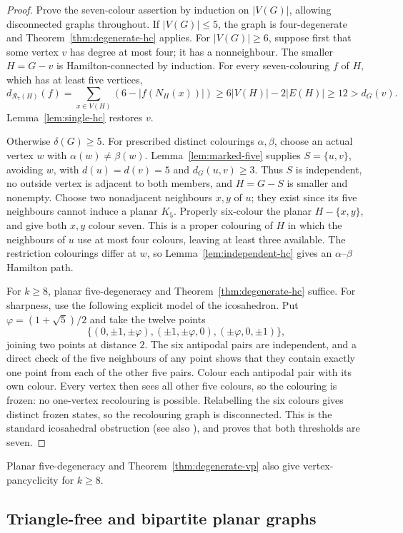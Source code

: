 \documentclass[11pt]{article}
\theoremstyle{remark}
\newcommand{\R}{\mathcal R}
\numberwithin{equation}{section}
\numberwithin{table}{section}
\begin{document}
\begin{proof}
Prove the seven-colour assertion by induction on $|V(G)|$, allowing
disconnected graphs throughout.  If $|V(G)|\le5$, the graph is
four-degenerate and Theorem~\ref{thm:degenerate-hc} applies.
For $|V(G)|\ge6$, suppose first that some vertex $v$ has degree at
most four; it has a nonneighbour.  The smaller $H=G-v$ is Hamilton-connected by induction.
For every seven-colouring $f$ of $H$, which has at least five vertices,
\[
 d_{\R_7(H)}(f)
 =\sum_{x\in V(H)}(6-|f(N_H(x))|)
 \ge6|V(H)|-2|E(H)|\ge12>d_G(v).
\]
Lemma~\ref{lem:single-hc} restores $v$.

Otherwise $\delta(G)\ge5$.  For prescribed distinct colourings
$\alpha,\beta$, choose an actual vertex $w$ with
$\alpha(w)\ne\beta(w)$.  Lemma~\ref{lem:marked-five} supplies
$S=\{u,v\}$, avoiding $w$, with $d(u)=d(v)=5$ and
$d_G(u,v)\ge3$.  Thus $S$ is independent, no outside vertex is
adjacent to both members, and $H=G-S$ is smaller and nonempty.
Choose two nonadjacent neighbours $x,y$ of $u$; they exist since its
five neighbours cannot induce a planar $K_5$.  Properly six-colour the
planar $H-\{x,y\}$, and give both $x,y$ colour seven.  This is a
proper colouring of $H$ in which the neighbours of $u$ use at most
four colours, leaving at least three available.  The restriction
colourings differ at $w$, so Lemma~\ref{lem:independent-hc} gives
an $\alpha$--$\beta$ Hamilton path.

For $k\ge8$, planar five-degeneracy and
Theorem~\ref{thm:degenerate-hc} suffice.  For sharpness, use the following
explicit model of the icosahedron.  Put $\varphi=(1+\sqrt5)/2$ and take the
twelve points
\[
 \{(0,\pm1,\pm\varphi),(\pm1,\pm\varphi,0),
          (\pm\varphi,0,\pm1)\},
\]
joining two points at distance $2$.  The six antipodal pairs are independent,
and a direct check of the five neighbours of any point shows that they contain
exactly one point from each of the other five pairs.  Colour each antipodal
pair with its own colour.  Every vertex then sees all other five colours, so
the colouring is frozen: no one-vertex recolouring is possible.  Relabelling
the six colours gives distinct frozen states, so the recolouring graph is
disconnected.  This is the standard icosahedral obstruction (see also
\cite{BP16}), and proves that both thresholds are seven.
\end{proof}

Planar five-degeneracy and Theorem~\ref{thm:degenerate-vp} also give
vertex-pancyclicity for $k\ge8$.

\subsection{Triangle-free and bipartite planar graphs}
\end{document}

